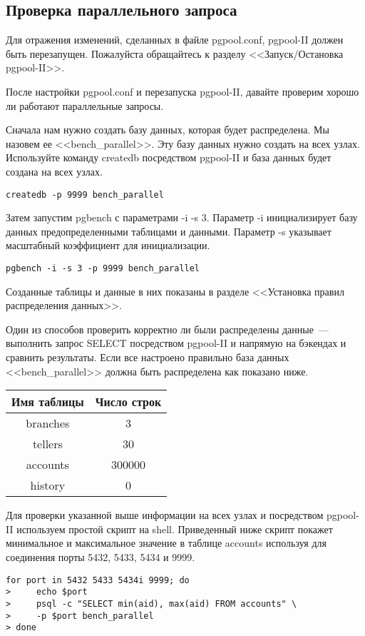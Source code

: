 \subsection{Проверка параллельного запроса}
Для отражения изменений, сделанных в файле pgpool.conf, pgpool-II должен быть перезапущен. 
Пожалуйста обращайтесь к разделу <<Запуск/Остановка pgpool-II>>.

После настройки pgpool.conf и перезапуска pgpool-II, давайте проверим хорошо ли работают параллельные запросы.

Сначала нам нужно создать базу данных, которая будет распределена. Мы назовем ее <<bench\_parallel>>. 
Эту базу данных нужно создать на всех узлах. Используйте команду createdb посредством pgpool-II и база 
данных будет создана на всех узлах.
\begin{lstlisting}[label=lst:pgpool37,caption=Проверка параллельного запроса]
createdb -p 9999 bench_parallel
\end{lstlisting}

Затем запустим pgbench с параметрами -i -s 3. Параметр -i инициализирует базу данных предопределенными 
таблицами и данными. Параметр -s указывает масштабный коэффициент для инициализации.
\begin{lstlisting}[label=lst:pgpool38,caption=Проверка параллельного запроса]
pgbench -i -s 3 -p 9999 bench_parallel
\end{lstlisting}

Созданные таблицы и данные в них показаны в разделе <<Установка правил распределения данных>>.

Один из способов проверить корректно ли были распределены данные~--- выполнить запрос SELECT посредством 
pgpool-II и напрямую на бэкендах и сравнить результаты. Если все настроено правильно база данных 
<<bench\_parallel>> должна быть распределена как показано ниже.

\begin{tabular}{ | c | c | }
  \hline
  Имя таблицы & Число строк \\
  \hline
  branches & 3 \\
  \hline
  tellers & 30 \\
  \hline
  accounts & 300000 \\
  \hline
  history & 0 \\
  \hline
\end{tabular}

Для проверки указанной выше информации на всех узлах и посредством pgpool-II используем простой скрипт на shell. 
Приведенный ниже скрипт покажет минимальное и максимальное значение в таблице accounts используя для соединения 
порты 5432, 5433, 5434 и 9999.
\begin{lstlisting}[label=lst:pgpool39,caption=Проверка параллельного запроса]
for port in 5432 5433 5434i 9999; do
>     echo $port
>     psql -c "SELECT min(aid), max(aid) FROM accounts" \
>     -p $port bench_parallel
> done
\end{lstlisting}


